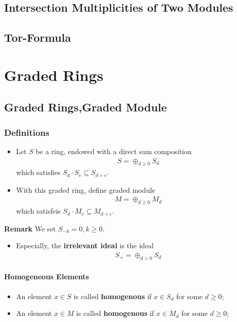 \documentclass[Total.tex]{subfiles}
\begin{document}
		\section{Intersection Multiplicities of Two Modules}
		\section{Tor-Formula}
	\chapter{Graded Rings}
		\section{Graded Rings,Graded Module}
		
			\subsection{Definitions}
			\begin{Def}
				\begin{itemize}
					\item Let $S$ be a ring, endowed with a direct sum composition
					\begin{gather*}
						S=\oplus_{d\geq 0} S_d
					\end{gather*}
					which satisfies $S_d\cdot S_e\subseteq S_{d+e}$. 
					\item With this graded ring, define graded module 
					\begin{gather*}
						M=\oplus_{d\geq 0} M_d
					\end{gather*}
					which satisfeis $S_d\cdot M_e\subseteq M_{d+e}$.
				\end{itemize}
				
				\textbf{Remark} We set $S_{-k}=0,k\geq 0$.
				\begin{itemize}
					\item 
					Especially, the \textbf{irrelevant ideal} is the ideal
					\begin{gather*}
						S_+=\oplus_{d>0} S_d
					\end{gather*}
				\end{itemize}
			\end{Def}
			\subsubsection{Homogeneous Elements}
			\begin{Def}
				\begin{itemize}
					\item An element $x\in S$ is called \textbf{homogenous} if $x\in S_d$ for some $d\geq 0$;
					\item An element $x\in M$ is called \textbf{homogenous} if $x\in M_d$ for some $d\geq 0$;
				\end{itemize} 
			\end{Def}
\end{document}
